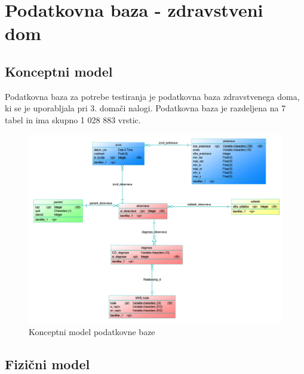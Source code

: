 \documentclass[a4paper,11pt]{report}
\begin{document}
\chapter{Podatkovna baza - zdravstveni dom}


\section{Konceptni model}
Podatkovna baza za potrebe testiranja je podatkovna baza zdravstvenega doma, ki se je uporabljala pri 3. domači nalogi.
Podatkovna baza je razdeljena na 7 tabel in ima skupno 1 028 883 vrstic.

\begin{figure}[htb]
    \noindent\includegraphics[width=\linewidth]{./pics/konceptni.png}
    \caption{Konceptni model podatkovne baze}
 \end{figure}

\section{Fizični model}
\end{document}
